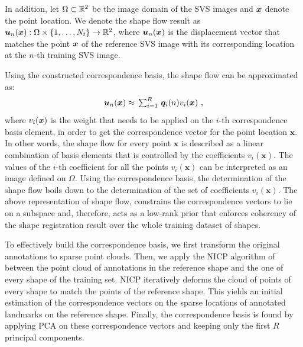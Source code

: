 In addition, let $\Omega \subset \mathbb{R}^2$ be the image domain of the SVS images and $\boldsymbol{x}$ denote the point location. We denote the shape flow result as $\bm{u}_n(\boldsymbol{x}):\Omega\times \{1,\ldots,N_t\}
\rightarrow \mathbb{R}^2$,  where $\bm{u}_n(\boldsymbol{x})$ is the displacement vector that matches the point $\boldsymbol{x}$ of the reference SVS image with its corresponding location at the $n$-th training SVS image.

Using the constructed correspondence basis, the shape flow can be approximated as:
\vspace{-5pt}
\begin{equation}\label{eq:LinTrajModel}
    \bm{u}_n(\bx) \approx
    \textstyle \, \sum_{i=1}^R \, \bm{q}_i(n)v_i(\bx) \,\, ,
\vspace{-5pt}
\end{equation}
where $v_i(\boldsymbol{x})$ is the weight that needs to be applied on the $i$-th correspondence basis element, in order to get the correspondence vector for the point location $\bm{x}$. In other words, the shape flow for every point $\bm{x}$ is described as a linear combination of basis elements that is controlled by the coefficients $v_i(\bm{x})$.
The values of the $i$-th coefficient for all the points $v_i(\bm{x})$ can be interpreted as an image defined on $\Omega$. Using the correspondence basis, the determination of the shape flow boils down to the determination of the set of coefficients $v_i(\bm{x})$. The above representation of shape flow, constrains the correspondence vectors to lie on a subspace and, therefore, acts as a low-rank prior that enforces coherency of the shape registration result over the whole training dataset of shapes.


To effectively build the correspondence basis, we first transform the original annotations to sparse point clouds. Then, we apply the NICP algorithm of \cite{Amber2007} between the point cloud of annotations in the reference shape and the one of every shape of the training set. NICP iteratively deforms the cloud of points of every shape to match the points of the reference shape. This yields an initial estimation of the correspondence vectors on the sparse locations of annotated landmarks on the reference shape. Finally, the correspondence basis is found by applying PCA on these correspondence vectors and keeping only the first $R$ principal components.



